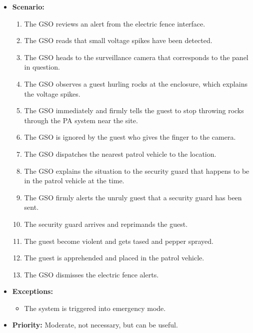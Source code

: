 \documentclass[12pt]{article}
\begin{document}
\begin{itemize}
        \item[]\textbf{Scenario:}
            \begin{enumerate}
                \item The GSO reviews an alert from the electric fence interface.
                \item The GSO reads that small voltage spikes have been detected.
                \item The GSO heads to the surveillance camera that corresponds to the
                panel in question.
                \item The GSO observes a guest hurling rocks at the enclosure, which
                explains the voltage spikes.
                \item The GSO immediately and firmly tells the guest to stop throwing rocks
                through the PA system near the site.
                \item The GSO is ignored by the guest who gives the finger to the camera.
                \item The GSO dispatches the nearest patrol vehicle to the location.
                \item The GSO explains the situation to the security guard that happens 
                to be in the patrol vehicle at the time.
                \item The GSO firmly alerts the unruly guest that a security guard has been sent.
                \item The security guard arrives and reprimands the guest.
                \item The guest become violent and gets tased and pepper sprayed.
                \item The guest is apprehended and placed in the patrol vehicle.
                \item The GSO dismisses the electric fence alerts.
            \end{enumerate}

        \item[]\textbf{Exceptions:}
            \begin{itemize}
                \item[] The system is triggered into emergency mode.
            \end{itemize}

        \item[]\textbf{Priority:}
            Moderate, not necessary, but can be useful.
            

\end{itemize}
\end{document}
